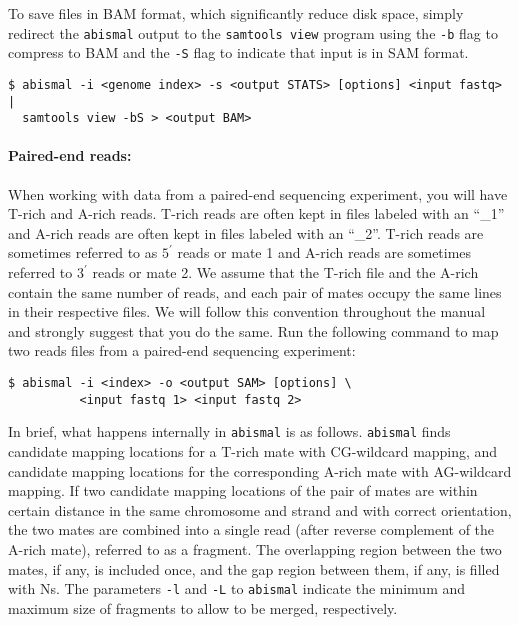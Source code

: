 \documentclass[10pt]{article}
\newcommand{\prog}[1]{\texttt{#1}}
\newcommand{\op}[1]{\texttt{#1}}
\begin{document}
To save files in BAM format, which significantly reduce disk space,
simply redirect the \prog{abismal} output to the \prog{samtools view}
program using the \op{-b} flag to compress to BAM and the \op{-S} flag
to indicate that input is in SAM format.

\begin{verbatim}
$ abismal -i <genome index> -s <output STATS> [options] <input fastq> |
  samtools view -bS > <output BAM>
\end{verbatim}

\paragraph{Paired-end reads:}

When working with data from a paired-end sequencing experiment, you
will have T-rich and A-rich reads. T-rich reads are often kept in
files labeled with an ``\_1'' and A-rich reads are often kept in files
labeled with an ``\_2''.  T-rich reads are sometimes referred to as
$5^{\prime}$ reads or mate 1 and A-rich reads are sometimes referred
to $3^{\prime}$ reads or mate 2. We assume that the T-rich file and
the A-rich contain the same number of reads, and each pair of mates
occupy the same lines in their respective files. We will follow this
convention throughout the manual and strongly suggest that you do the
same. Run the following command to map two
reads files from a paired-end sequencing experiment:

\begin{verbatim}
$ abismal -i <index> -o <output SAM> [options] \
          <input fastq 1> <input fastq 2>
\end{verbatim}

In brief, what happens internally in \prog{abismal} is as follows.
\prog{abismal} finds candidate mapping locations for a T-rich mate
with CG-wildcard mapping, and candidate mapping locations for the
corresponding A-rich mate with AG-wildcard mapping. If two candidate
mapping locations of the pair of mates are within certain distance in
the same chromosome and strand and with correct orientation, the two
mates are combined into a single read (after reverse complement of the
A-rich mate), referred to as a fragment. The overlapping region
between the two mates, if any, is included once, and the gap region
between them, if any, is filled with Ns. The parameters \op{-l} and
\op{-L} to \prog{abismal} indicate the minimum and maximum size of
fragments to allow to be merged, respectively.
\end{document}
